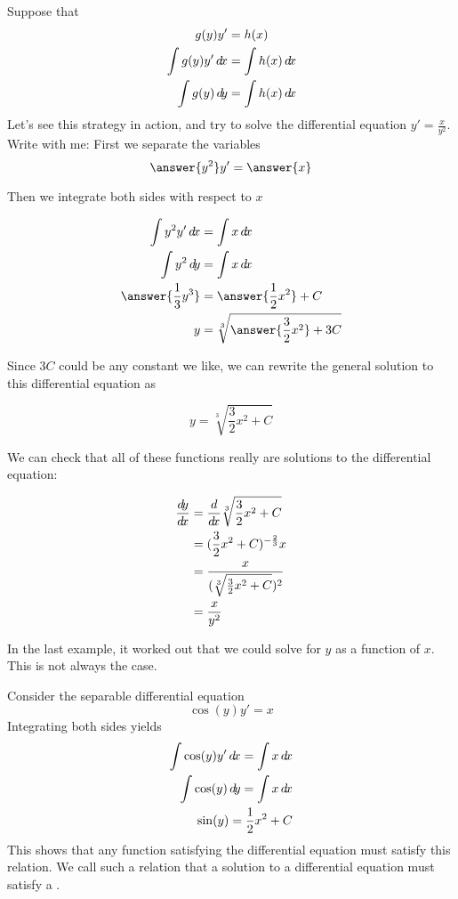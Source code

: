 \documentclass{ximera}
\begin{document}
\begin{example}
  Suppose that 
  \begin{align*}
    g(y)y'  &= h(x)\\
    \int g(y) y' \d x &= \int h(x) \d x\\
    \int g(y) \d y &= \int h(x) \d x
  \end{align*}
  Let's see this strategy in action, and try to solve the differential equation $y' = \frac{x}{y^2}$.
  Write with me:
  First we separate the variables
  \[
  \answer{y^2} y' = \answer{x}
  \]
  
  Then we integrate both sides with respect to $x$
  
  \begin{align*}
    \int y^2 y' \d x &= \int x \d x\\
    \int y^2 \d y &= \int x \d x\\
    \answer{\frac{1}{3} y^3} &= \answer{\frac{1}{2}x^2}+C\\
    y &= \sqrt[3]{\answer{\frac{3}{2}x^2}+3C}
  \end{align*}
  
  Since $3C$ could be any constant we like, we can rewrite the general solution to this differential equation as 
  
  \[
  y = \sqrt[3]{\frac{3}{2}x^2+C}
  \]
  
  We can check that all of these functions really are solutions to the differential equation:
  
  \begin{align*}
    \frac{\mathop{}\!d\! y}{\mathop{}\!d\! x} &= \frac{d}{\mathop{}\!d\! x} \sqrt[3]{\frac{3}{2}x^2+C}\\
    &=(\frac{3}{2}x^2+C)^{-\frac{2}{3}} x\\
    &= \frac{x}{(\sqrt[3]{\frac{3}{2}x^2+C})^2}\\
    &= \frac{x}{y^2}
  \end{align*}
\end{example}


In the last example, it worked out that we could solve for $y$ as a function of $x$.  This is not always the case.

\begin{example}
  Consider the separable differential equation
  \[
  \cos(y) y' = x
  \]
  Integrating both sides yields
  \begin{align*}
    \int \cos(y) y' \d x = \int x \d x\\
    \int \cos(y) \d y = \int x \d x\\
    \sin(y) = \frac{1}{2}x^2+C
  \end{align*}
  This shows that any function satisfying the differential equation
  must satisfy this relation.  We call such a relation that a solution
  to a differential equation must satisfy a .	
\end{example}
\end{document}
